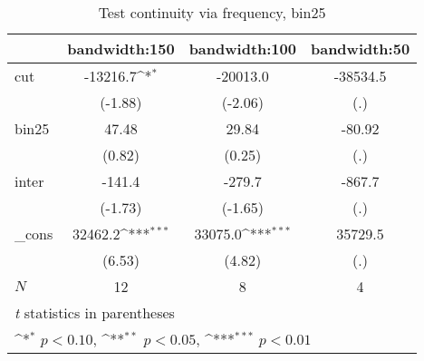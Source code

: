 \begin{table}[htbp]\centering
\def\sym#1{\ifmmode^{#1}\else\(^{#1}\)\fi}
\caption{Test continuity via frequency, bin25}
\begin{tabular}{l*{3}{c}}
\hline\hline
            &\multicolumn{1}{c}{bandwidth:150}&\multicolumn{1}{c}{bandwidth:100}&\multicolumn{1}{c}{bandwidth:50}\\
\hline
cut         &    -13216.7\sym{*}  &    -20013.0         &    -38534.5         \\
            &     (-1.88)         &     (-2.06)         &         (.)         \\
[1em]
bin25       &       47.48         &       29.84         &      -80.92         \\
            &      (0.82)         &      (0.25)         &         (.)         \\
[1em]
inter       &      -141.4         &      -279.7         &      -867.7         \\
            &     (-1.73)         &     (-1.65)         &         (.)         \\
[1em]
\_cons      &     32462.2\sym{***}&     33075.0\sym{***}&     35729.5         \\
            &      (6.53)         &      (4.82)         &         (.)         \\
\hline
\(N\)       &          12         &           8         &           4         \\
\hline\hline
\multicolumn{4}{l}{\footnotesize \textit{t} statistics in parentheses}\\
\multicolumn{4}{l}{\footnotesize \sym{*} \(p<0.10\), \sym{**} \(p<0.05\), \sym{***} \(p<0.01\)}\\
\end{tabular}
\end{table}
